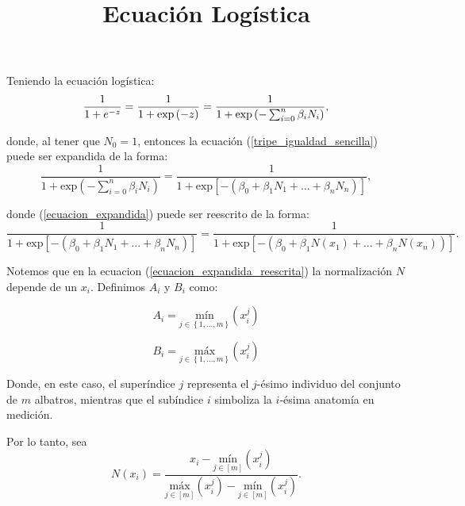 \documentclass{article}
\begin{document}
\title{Ecuación Logística}

\maketitle

Teniendo la ecuación logística:
\begin{equation}
    \label{tripe_igualdad_sencilla}
    \frac{1}{1+e^{-z}} = \frac{1}{1+\mbox{\mbox{exp}}\left ( -z\right )} = \frac{1}{1+\mbox{\mbox{exp}}\left (-\sum_{i=0}^{n} \beta _{i}N_{i} \right )} ,
\end{equation}

donde, al tener que $N_{0}=1$, entonces la ecuación (\ref{tripe_igualdad_sencilla}) puede ser expandida de la forma:
\begin{equation}
    \label{ecuacion_expandida}
    \frac{1}{1+\mbox{exp}\left (-\sum_{i=0}^{n} \beta _{i}N_{i} \right )} = \frac{1}{1+\mbox{exp}\left [ -\left ( \beta _{0} + \beta _{1}N_{1}+...+\beta_{n}N_{n} \right ) \right ]} ,
\end{equation}

donde (\ref{ecuacion_expandida}) puede ser reescrito de la forma:
\begin{equation}
    \label{ecuacion_expandida_reescrita}    
    \frac{1}{1+\mbox{exp}\left [ -\left ( \beta _{0} + \beta _{1}N_{1}+...+\beta_{n}N_{n} \right ) \right ]} = \frac{1}{1+\mbox{exp}\left [ -\left ( \beta _{0} + \beta _{1}N(x_{1})+...+\beta_{n}N(x_{n})\right ) \right ]} .
\end{equation}

Notemos que en la ecuacion (\ref{ecuacion_expandida_reescrita}) la normalización $N$ depende de un $x_{i}$. Definimos $A_{i}$ y $B_{i}$ como:

\begin{equation}
    \label{maximos_A}
    A_{i}= \underset{j\in \left \{ 1,...,m \right \}}{\mbox{mín}}\left ( x_{i}^{j} \right )
\end{equation}

\begin{equation}
    \label{minimos_B}
    B_{i}= \underset{j\in \left \{ 1,...,m \right \}}{\mbox{máx}}\left ( x_{i}^{j} \right )
\end{equation}

Donde, en este caso, el superíndice $j$ representa el $j$-ésimo individuo del conjunto de $m$ albatros, mientras que el subíndice $i$ simboliza la $i$-ésima anatomía en medición.

Por lo tanto, sea 
\begin{equation} \label{normalizacion} N\left ( x_{i} \right )= \frac{x_{i} - \underset{j\in [m ]}{\mbox{mín}}\left (  x_{i}^{j}\right )}{\underset{j\in [m ]}{\mbox{máx}}\left (  x_{i}^{j}\right )-\underset{j\in [m ]}{\mbox{mín}}\left (  x_{i}^{j}\right )} .
\end{equation}
\end{document}
